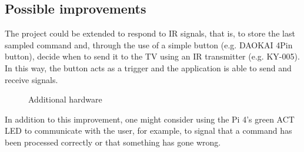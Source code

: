 \documentclass[a4paper, 12pt]{article}
\begin{document}
\subsection{Possible improvements}

The project could be extended to respond to IR signals, that is, to store the last sampled command and, through the use of a simple button (e.g. DAOKAI 4Pin button), decide when to send it to the TV using an IR transmitter (e.g. KY-005). \\
In this way, the button acts as a trigger and the application is able to send and receive signals.

\begin{figure}[h]
    \centering
    \caption{Additional hardware}
\end{figure}

In addition to this improvement, one might consider using the Pi 4's green ACT LED to communicate with the user, for example, to signal that a command has been processed correctly or that something has gone wrong.

\printbibliography
\end{document}
